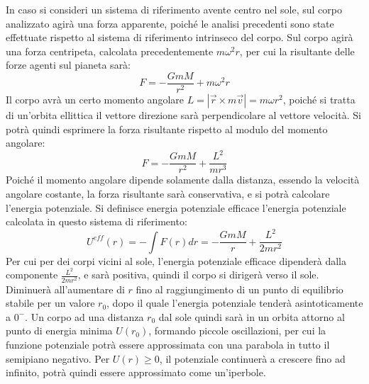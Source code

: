 \documentclass{article}
\numberwithin{equation}{subsection}
\begin{document}
In caso si consideri un sistema di riferimento avente centro nel sole, sul corpo analizzato agirà una forza apparente, poiché le analisi 
precedenti sono state effettuate rispetto al sistema di riferimento intrinseco del corpo. Sul corpo agirà una forza centripeta, calcolata 
precedentemente $m\omega^2r$, per cui la risultante delle forze agenti sul pianeta sarà:
\begin{equation*}
    F=-\displaystyle\frac{GmM}{r^2}+m\omega^2r
\end{equation*}
Il corpo avrà un certo momento angolare $L=|\vec{r}\times m\vec{v}|=m\omega r^2$, poiché si tratta di un'orbita ellittica il vettore direzione 
sarà perpendicolare al vettore velocità. Si potrà quindi esprimere la forza risultante rispetto al modulo del momento angolare:
\begin{equation*}
    F=-\displaystyle\frac{GmM}{r^2}+\frac{L^2}{mr^3}
\end{equation*}
Poiché il momento angolare dipende solamente dalla distanza, essendo la velocità angolare costante, la forza risultante sarà conservativa, e si potrà 
calcolare l'energia potenziale. Si definisce energia potenziale efficace l'energia potenziale calcolata in questo sistema di riferimento:
\begin{equation}
    U^{eff}(r)=-\int F(r)dr=-\displaystyle\frac{GmM}{r}+\frac{L^2}{2mr^2}
\end{equation}
Per cui per dei corpi vicini al sole, l'energia potenziale efficace dipenderà dalla componente $\displaystyle\frac{L^2}{2mr^2}$, e sarà positiva, quindi 
il corpo si dirigerà verso il sole. Diminuerà all'aumentare di $r$ fino al raggiungimento di un punto di equilibrio stabile per un valore 
$r_0$, dopo il quale l'energia potenziale tenderà asintoticamente a $0^-$. Un corpo ad una distanza $r_0$ dal sole quindi sarà in un orbita attorno al 
punto di energia minima $U(r_0)$, formando piccole oscillazioni, per cui la funzione potenziale potrà essere approssimata con una parabola in 
tutto il semipiano negativo. Per $U(r)\geq0$, il potenziale continuerà a crescere fino ad infinito, potrà quindi essere approssimato come un'iperbole. 

\begin{center}
\end{center}
\end{document}
